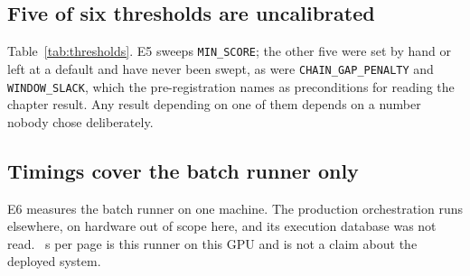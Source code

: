 \subsection{Five of six thresholds are uncalibrated}

Table~\ref{tab:thresholds}. E5 sweeps \texttt{MIN\_SCORE}; the other five were
set by hand or left at a default and have never been swept, as were
\texttt{CHAIN\_GAP\_PENALTY} and \texttt{WINDOW\_SLACK}, which the
pre-registration names as preconditions for reading the chapter result. Any
result depending on one of them depends on a number nobody chose deliberately.

\subsection{Timings cover the batch runner only}

E6 measures the batch runner on one machine. The production orchestration runs
elsewhere, on hardware out of scope here, and its execution database was not
read. \ocrSecondsPerPage{}~s per page is this runner on this GPU and is not a
claim about the deployed system.
